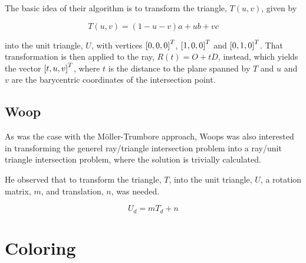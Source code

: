 

The basic idea of their algorithm is to transform the triangle,
$T(u,v)$, given by

\begin{displaymath}
  T(u,v) = (1-u-v)a + ub + vc
\end{displaymath}

into the unit triangle, $U$, with
vertices $\left[0, 0, 0 \right]^T$, $\left[1, 0, 0 \right]^T$ and
$\left[0, 1, 0 \right]^T$. That transformation is then applied to the ray,
$R(t) = O + tD$, instead, which yields the vector
$\left[t, u, v \right]^T$, where $t$ is the distance to the plane spanned
by $T$ and $u$ and $v$ are the barycentric coordinates of the
intersection point.


\subsection{Woop}


As was the case with the Möller-Trumbore approach, Woops was also
interested in transforming the generel ray/triangle intersection
problem into a ray/unit triangle intersection problem, where the
solution is trivially calculated.

He observed that to transform the triangle, $T$, into the unit
triangle, $U$, a rotation matrix, $m$, and translation, $n$, was
needed.

\begin{displaymath}
  U_d = m T_d + n
\end{displaymath}






\section{Coloring}

